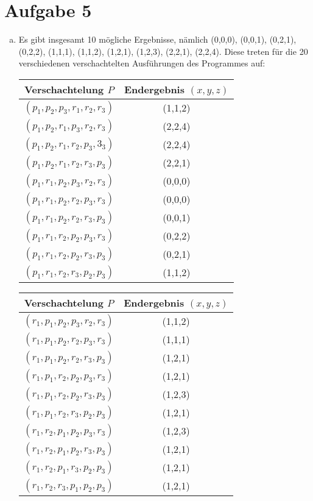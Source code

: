 \documentclass[numbers=noendperiod]{scrartcl}
\begin{document}
\section*{Aufgabe 5}
\begin{enumerate}[a)]
	\item Es gibt insgesamt 10 mögliche Ergebnisse, nämlich (0,0,0), (0,0,1), (0,2,1), (0,2,2), (1,1,1), (1,1,2), (1,2,1), (1,2,3), (2,2,1), (2,2,4). Diese treten für die 20 verschiedenen verschachtelten Ausführungen des Programmes auf:
	
	\begin{tabular}{|c|c|}
		\hline Verschachtelung $P$ & Endergebnis $(x,y,z)$\\\hline
		$(p_1, p_2, p_3, r_1, r_2, r_3)$ & (1,1,2)\\
		$(p_1, p_2, r_1, p_3, r_2, r_3)$ & (2,2,4)\\
		$(p_1, p_2, r_1, r_2, p_3, 3_3)$ & (2,2,4)\\
		$(p_1, p_2, r_1, r_2, r_3, p_3)$ & (2,2,1)\\
		$(p_1, r_1, p_2, p_3, r_2, r_3)$ & (0,0,0)\\
		$(p_1, r_1, p_2, r_2, p_3, r_3)$ & (0,0,0)\\
		$(p_1 ,r_1, p_2, r_2, r_3, p_3)$ & (0,0,1)\\
		$(p_1, r_1, r_2, p_2, p_3, r_3)$ & (0,2,2)\\
		$(p_1, r_1, r_2, p_2, r_3, p_3)$ & (0,2,1)\\
		$(p_1, r_1, r_2, r_3, p_2, p_3)$ & (1,1,2)\\\hline
	\end{tabular}
	\begin{tabular}{|c|c|}
		\hline Verschachtelung $P$ & Endergebnis $(x,y,z)$\\\hline
		$(r_1, p_1, p_2, p_3, r_2, r_3)$ & (1,1,2)\\
		$(r_1, p_1, p_2, r_2, p_3, r_3)$ & (1,1,1)\\
		$(r_1, p_1, p_2, r_2, r_3, p_3)$ & (1,2,1)\\
		$(r_1, p_1, r_2, p_2, p_3, r_3)$ & (1,2,1)\\
		$(r_1, p_1, r_2, p_2, r_3, p_3)$ & (1,2,3)\\
		$(r_1, p_1, r_2, r_3, p_2, p_3)$ & (1,2,1)\\
		$(r_1, r_2, p_1, p_2, p_3, r_3)$ & (1,2,3) \\
		$(r_1, r_2, p_1, p_2, r_3, p_3)$ & (1,2,1)\\
		$(r_1, r_2, p_1, r_3, p_2, p_3)$ & (1,2,1)\\
		$(r_1, r_2, r_3, p_1, p_2, p_3)$ & (1,2,1)\\\hline
	\end{tabular}
	

\end{enumerate}
\end{document}
